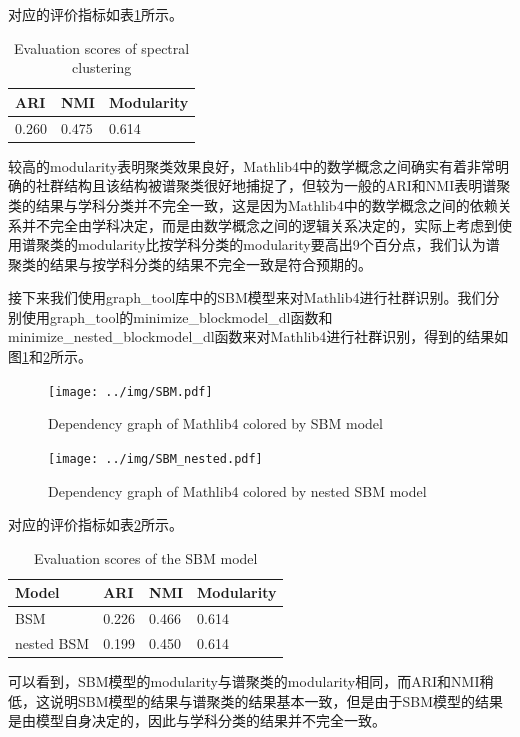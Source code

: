对应的评价指标如表\ref{tab:score}所示。
\begin{table}[H]
  \centering
  \begin{tabular}{lll}
    \toprule
    ARI & NMI & Modularity\\
    \midrule
    0.260 & 0.475 & 0.614\\
    \bottomrule
  \end{tabular}
  \caption{Evaluation scores of spectral clustering}
  \label{tab:score}
\end{table}

较高的modularity表明聚类效果良好，Mathlib4中的数学概念之间确实有着非常明确的社群结构且该结构被谱聚类很好地捕捉了，但较为一般的ARI和NMI表明谱聚类的结果与学科分类并不完全一致，这是因为Mathlib4中的数学概念之间的依赖关系并不完全由学科决定，而是由数学概念之间的逻辑关系决定的，实际上考虑到使用谱聚类的modularity比按学科分类的modularity要高出9个百分点，我们认为谱聚类的结果与按学科分类的结果不完全一致是符合预期的。

接下来我们使用graph\_tool库中的SBM模型来对Mathlib4进行社群识别。我们分别使用graph\_tool的minimize\_blockmodel\_dl函数和minimize\_nested\_blockmodel\_dl函数来对Mathlib4进行社群识别，得到的结果如图\ref{fig:SBM}和\ref{fig:nest_SBM}所示。

\begin{figure}[H]
    \centering
    \texttt{[image: ../img/SBM.pdf]}
    \caption{Dependency graph of Mathlib4 colored by SBM model}
    \label{fig:SBM}
\end{figure}

\begin{figure}[H]
  \centering
  \texttt{[image: ../img/SBM\_nested.pdf]}
  \caption{Dependency graph of Mathlib4 colored by nested SBM model}
  \label{fig:nest_SBM}
\end{figure}

对应的评价指标如表\ref{tab:score2}所示。
\begin{table}[H]
  \centering
  \begin{tabular}{llll}
    \toprule
    Model & ARI & NMI & Modularity\\
    \midrule
    BSM & 0.226 & 0.466 & 0.614\\
    nested BSM & 0.199 & 0.450 & 0.614\\
    \bottomrule
  \end{tabular}
  \caption{Evaluation scores of the SBM model}
  \label{tab:score2}
\end{table}

可以看到，SBM模型的modularity与谱聚类的modularity相同，而ARI和NMI稍低，这说明SBM模型的结果与谱聚类的结果基本一致，但是由于SBM模型的结果是由模型自身决定的，因此与学科分类的结果并不完全一致。





